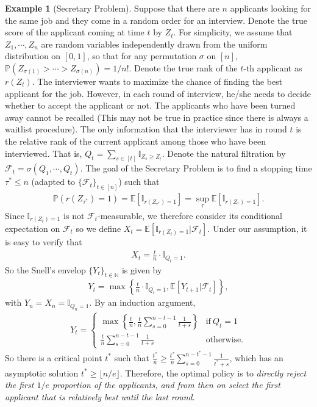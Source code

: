 \documentclass[letterpaper,11pt,openright,openany]{book}
\numberwithin{equation}{section}
\theoremstyle{plain}
\theoremstyle{definition}
\newtheorem{Ex}[Th]{Example}
\def\N{{\mathbb N}}
\def\E{{\mathbb E}}
\def\F{{\mathcal F}}
\def\P{{\mathbb P}}
\begin{document}
 
\begin{Ex}[Secretary Problem]
Suppose that there are $n$ applicants looking for the same job and they come in a random order for an interview. Denote the true score of the applicant coming at time $t$ by $Z_t$. 
For simplicity, we assume that $Z_1,\cdots, Z_n$ are random variables independently drawn from the uniform distribution on $[0,1]$, so that for any permutation $\sigma$ on $[n]$, $\P(Z_{\sigma(1)}>\cdots>Z_{\sigma(n)})=1/n!$. 
Denote the true rank of the $t$-th applicant as $r(Z_t)$. 
The interviewer wants to maximize the chance of finding the best applicant for the job. 
However, in each round of interview, he/she needs to decide whether to accept the applicant or not. 
The applicants who have been turned away cannot be recalled (This may not be true in practice since there is always a waitlist procedure). 
The only information that the interviewer has in round $t$ is the relative rank of the current applicant among those who have been interviewed. That is, $Q_t = \sum_{s\in [t]}\mathbb I_{Z_s\geq Z_t}$. 
Denote the natural filtration by $\F_t = \sigma(Q_1, \cdots, Q_t)$. 
The goal of the Secretary Problem is to find a stopping time $\tau^*\leq n$ (adapted to $\{\F_t\}_{t\in [n]}$) such that 
\begin{align*}
\P\left(r(Z_{\tau^*})=1\right)=\E\left[\mathbb I_{r(Z_{\tau^*})=1}\right]=\sup_{\tau}\E\left[\mathbb I_{r(Z_\tau)=1}\right].
\end{align*}
Since $\mathbb I_{r(Z_t)=1}$ is not $\F_t$-measurable, we therefore consider its conditional expectation on $\F_t$ so we define $X_t = \E[\mathbb I_{r(Z_t)=1}|\F_t]$. Under our assumption, it is easy to verify that 
\begin{align*}
X_t = \frac{t}{n}\cdot\mathbb I_{Q_t = 1}.
\end{align*}
So the Snell's envelop $\{Y_t\}_{t\in\N}$ is given by 
\begin{align*}
Y_t = \max\left\{\frac{t}{n}\cdot\mathbb I_{Q_t = 1}, \E[Y_{t+1}|\F_t]\right\},
\end{align*}
with $Y_n = X_n=\mathbb I_{Q_n = 1}$. By an induction argument,  
\begin{align*}
Y_t = 
 \begin{cases} 
      \max\left\{\frac{t}{n}, \frac{t}{n}\sum_{s=0}^{n-t-1}\frac{1}{t+s}\right\} & \text{if}\  Q_t = 1 \\
     \frac{t}{n}\sum_{s=0}^{n-t-1}\frac{1}{t+s} & \text{otherwise}.
         \end{cases}
\end{align*}
So there is a critical point $t^*$ such that $\frac{t^*}{n}\geq \frac{t^*}{n}\sum_{s=0}^{n-t^*-1}\frac{1}{t^*+s}$, which has an asymptotic solution $t^*\geq \lfloor n/e\rfloor$. Therefore, the optimal policy is to \emph{directly reject the first $1/e$ proportion of the applicants, and from then on select the first applicant that is relatively best until the last round}. 
\end{Ex}
\end{document}
